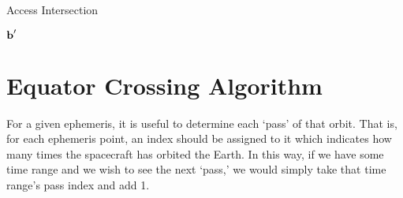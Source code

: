 \begin{algorithm}[h] 
    \caption{Access Intersection} 
    \label{alg:access-intersection}
    \begin{algorithmic}[1]




	     

	     

		 
		
		\Else
		\EndIf


	    \EndWhile 



	\State \Return $\bm{\mathrm{b}}'$
	\EndFunction
    \end{algorithmic}

\end{algorithm}


\section{Equator Crossing Algorithm} \label{sec:equator-crossing}

For a given ephemeris, it is useful to determine each `pass' of that orbit.
That is, for each ephemeris point, an index should be assigned to it which
indicates how many times the spacecraft has orbited the Earth. In this way, if
we have some time range and we wish to see the next `pass,' we would simply
take that time range's pass index and add 1.

